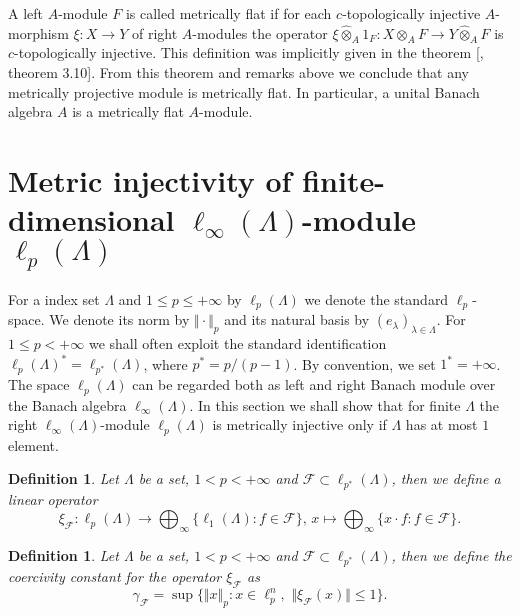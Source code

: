 \documentclass[12pt]{article}
\newtheorem{definition}[theorem]{Definition}
\newcommand{\projmodtens}[1]{\mathbin{\widehat{\otimes}}_{#1}}
\begin{document}
A left $A$-module $F$ is called metrically flat if for each $c$-topologically 
injective $A$-morphism $\xi:X\to Y$ of right $A$-modules the 
operator $\xi\projmodtens{A} 1_F:X\projmodtens{A} F\to Y\projmodtens{A} F$ 
is $c$-topologically injective. This definition was implicitly given in the 
theorem [\cite{GravInjProjBanMod}, theorem 3.10]. From this theorem and remarks 
above we conclude that any metrically projective module is metrically flat. In
particular, a unital Banach algebra $A$ is a metrically flat $A$-module.


\section{Metric injectivity of finite-dimensional 
\texorpdfstring{$\ell_\infty(\Lambda)$}{linftyLmbd}-module 
\texorpdfstring{$\ell_p(\Lambda)$}{lpLmbd}}
\label{MetrInjlinftynlpn}

For a index set $\Lambda$ and $1\leq p\leq +\infty$ by $\ell_p(\Lambda)$ we 
denote the standard $\ell_p$-space. We denote its norm 
by $\Vert\cdot\Vert_p$ and its natural basis 
by $(e_\lambda)_{\lambda\in\Lambda}$. For $1\leq p<+\infty$ we shall often 
exploit the standard identification $\ell_p(\Lambda)^*=\ell_{p^*}(\Lambda)$, 
where $p^*=p/(p-1)$. By convention, we set $1^*=+\infty$. The 
space $\ell_p(\Lambda)$ can be regarded both as left and right Banach module 
over the Banach algebra $\ell_\infty(\Lambda)$. In this section 
we shall show that for finite $\Lambda$ the 
right $\ell_\infty(\Lambda)$-module $\ell_p(\Lambda)$ is metrically injective 
only if $\Lambda$ has at most $1$ element.

\begin{definition}\label{StdEmbd} 
    Let $\Lambda$ be a set, $1<p<+\infty$ 
    and $\mathcal{F}\subset\ell_{p^*}(\Lambda)$, then we define a linear 
    operator
    \[
        \xi_{\mathcal{F}}: 
        \ell_p(\Lambda)\to\bigoplus_\infty\{\ell_1(\Lambda):f\in\mathcal{F}\},\,
        x \mapsto \bigoplus_\infty\{ x\cdot f: f\in\mathcal{F}\}.
    \]
\end{definition}

\begin{definition}\label{StdEmbdCoercv}
    Let $\Lambda$ be a set, $1<p<+\infty$ 
    and $\mathcal{F}\subset \ell_{p^*}(\Lambda)$, 
    then we define the coercivity constant for the operator $\xi_{\mathcal{F}}$ 
    as
    \[
        \gamma_{\mathcal{F}}=\sup\{
            \Vert x\Vert_p: 
            x\in\ell_p^n,\,\, \Vert \xi_{\mathcal{F}}(x)\Vert\leq 1
        \}.
    \]
\end{definition}
\end{document}
